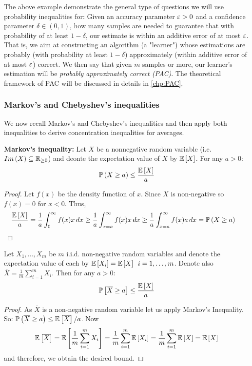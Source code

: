 The above example demonstrate the general type of questions we will use probability inequalities for: Given an accuracy parameter $\varepsilon > 0$ and a confidence
parameter $\delta \in \left(0,1\right)$, how many samples are needed to guarantee that with probability of at least $1- \delta$, our estimate is within an additive error of at most $\varepsilon$. That is, we aim at constructing an algorithm (a "learner") whose estimations are probably (with probability at least $1-\delta$) approximately (within additive error of at most $\varepsilon$) correct. We then say that given $m$ samples or more,  our learner's estimation will be  \emph{probably approximately correct (PAC)}. The theoretical framework of PAC will be discussed in details in \autoref{chp:PAC}.

\subsubsection{Markov's and Chebyshev's inequalities}
We now recall Markov's and Chebyshev's inequalities and then apply both inequalities to derive concentration inequalities for averages.
\begin{theorem} \textbf{Markov's inequality:} Let $X$ be a nonnegative random variable (i.e. $Im\left(X\right) \subseteq \mathbb{R} _{\ge 0}$) and deonte the expectation value of $X$ by $\mathbb{E}\left[X\right]$. For any $a>0$: $$ \mathbb{P} \left(X \geq a\right) \leq \frac{\mathbb{E}\left[X\right]}{a}$$
\end{theorem}
\begin{proof}
Let $f\left(x\right)$ be the density function of $x$. Since $X$ is non-negative so $f\left(x\right)=0$ for $x<0$. Thus,
\begin{align*}
	\frac{\mathbb{E}\left[X\right]}{a} &= \frac{1}{a}\int_{0} ^\infty f(x) x \,dx \ge \frac{1}{a}\int_{x =a} ^\infty f(x) x \,dx \ge \frac{1}{a}\int_{x =a} ^\infty f(x) a \, dx=\mathbb{P}\left(X \ge a\right)
\end{align*}
\end{proof}


\begin{corollary} \label{cor:markovAve}
Let $X_1,\ldots,X_m$ be $m$ i.i.d. non-negative random variables and denote the expectation value of each by  $\mathbb{E}\left[X_i\right]=\mathbb{E}\left[X\right]\,\,\, i = 1,\ldots,m$. Denote also  $\overline{X}=\frac{1}{m} \sum_{i=1} ^m X_i$. Then for any  $a>0$: $$ \mathbb{P} \left[\overline{X} \geq a\right] \leq \frac{\mathbb{E}\left[X \right]}{a}$$
\end{corollary}
\begin{proof}
As $\overline{X}$ is a non-negative random variable let us apply Markov's Inequality. So: $\mathbb{P} \left(\overline{X} \geq a\right) \leq \mathbb{E}\left[\overline{X}\right]/a$. Now 
\begin{align*}
	\mathbb{E}\left[\overline{X}\right] = \mathbb{E}\left[\frac{1}{m} \sum_{i=1} ^m X_i \right] 
		= \frac{1}{m} \sum_{i=1} ^m \mathbb{E}\left[X_i\right] 
		= \frac{1}{m} \sum_{i=1} ^m \mathbb{E}\left[X\right] 
		= \mathbb{E}\left[X\right]
\end{align*}
and therefore, we obtain the desired bound.
\end{proof}


